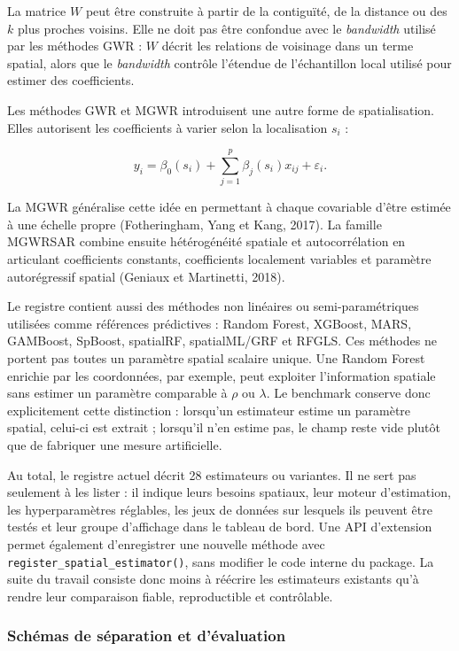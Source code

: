 \documentclass[11pt,a4paper]{article}
\begin{document}
La matrice $W$ peut être construite à partir de la contiguïté, de la distance ou des $k$ plus proches voisins. Elle ne doit pas être confondue avec le \textit{bandwidth} utilisé par les méthodes GWR : $W$ décrit les relations de voisinage dans un terme spatial, alors que le \textit{bandwidth} contrôle l'étendue de l'échantillon local utilisé pour estimer des coefficients.

Les méthodes GWR et MGWR introduisent une autre forme de spatialisation. Elles autorisent les coefficients à varier selon la localisation $s_i$ :

\begin{equation}
    y_i=\beta_0(s_i)+\sum_{j=1}^{p}\beta_j(s_i)x_{ij}+\varepsilon_i.
\end{equation}

La MGWR généralise cette idée en permettant à chaque covariable d'être estimée à une échelle propre (Fotheringham, Yang et Kang, 2017). La famille MGWRSAR combine ensuite hétérogénéité spatiale et autocorrélation en articulant coefficients constants, coefficients localement variables et paramètre autorégressif spatial (Geniaux et Martinetti, 2018).

Le registre contient aussi des méthodes non linéaires ou semi-paramétriques utilisées comme références prédictives : Random Forest, XGBoost, MARS, GAMBoost, SpBoost, spatialRF, spatialML/GRF et RFGLS. Ces méthodes ne portent pas toutes un paramètre spatial scalaire unique. Une Random Forest enrichie par les coordonnées, par exemple, peut exploiter l'information spatiale sans estimer un paramètre comparable à $\rho$ ou $\lambda$. Le benchmark conserve donc explicitement cette distinction : lorsqu'un estimateur estime un paramètre spatial, celui-ci est extrait ; lorsqu'il n'en estime pas, le champ reste vide plutôt que de fabriquer une mesure artificielle.

Au total, le registre actuel décrit 28 estimateurs ou variantes. Il ne sert pas seulement à les lister : il indique leurs besoins spatiaux, leur moteur d'estimation, les hyperparamètres réglables, les jeux de données sur lesquels ils peuvent être testés et leur groupe d'affichage dans le tableau de bord. Une API d'extension permet également d'enregistrer une nouvelle méthode avec \texttt{register\_spatial\_estimator()}, sans modifier le code interne du package. La suite du travail consiste donc moins à réécrire les estimateurs existants qu'à rendre leur comparaison fiable, reproductible et contrôlable.


\subsubsection{Schémas de séparation et d'évaluation}
\end{document}
